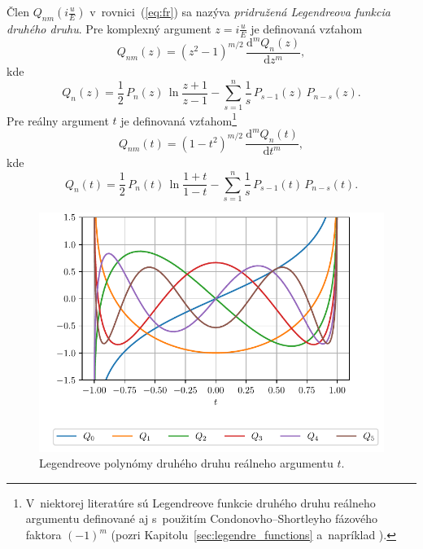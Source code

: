 \documentclass[a4paper, 12pt]{book}
\newcommand{\diff}{\mathrm d}
\begin{document}
Člen $Q_{nm}\left( i \frac{u}{E} \right)$ v~rovnici~(\ref{eq:fr}) sa nazýva 
\emph{pridružená Legendreova funkcia druhého druhu}.  Pre komplexný argument $z 
= i \frac{u}{E}$ je definovaná vzťahom \parencite{MoritzTheFigureOfTheEarth}
%
\begin{equation}
\label{eq:qnm_imag_def}
Q_{nm}(z) = (z^2 - 1)^{m \slash 2} \, \frac{\diff^m Q_n(z)}{\diff z^m}{,}
\end{equation}
%
kde
%
\begin{equation}
\label{eq:qn0_imag_def}
Q_{n}(z) = \frac{1}{2} \, P_n(z) \, \ln\frac{z + 1}{z - 1} - \sum_{s = 1}^n 
\frac{1}{s} \, P_{s - 1}(z) \, P_{n - s}(z){.}
\end{equation}
%
Pre reálny argument $t$ je definovaná vzťahom\footnote{V~niektorej literatúre 
sú Legendreove funkcie druhého druhu reálneho argumentu definované aj 
s~použitím Condonovho--Shortleyho fázového faktora $(-1)^m$ (pozri 
Kapitolu~\ref{sec:legendre_functions} a~napríklad \cite{Olver2010}).}
\parencite{MoritzPhysicalGeodesy}
%
\begin{equation}
\label{eq:qnm_real_def}
Q_{nm}(t) = (1 - t^2)^{m \slash 2} \, \frac{\diff^m Q_n(t)}{\diff t^m}{,}
\end{equation}
%
kde
%
\begin{equation}
\label{eq:qn0_real_def}
Q_{n}(t) = \frac{1}{2} \, P_n(t) \, \ln\frac{1 + t}{1 - t} - \sum_{s = 1}^n 
\frac{1}{s} \, P_{s - 1}(t) \, P_{n - s}(t){.}
\end{equation}

\begin{figure}
\centering
\includegraphics{./fig-legendre-polynomials-qn.pdf}
\caption{Legendreove polynómy druhého druhu reálneho argumentu $t$.}
\label{fig:lp_2nd}
\end{figure}
\end{document}
